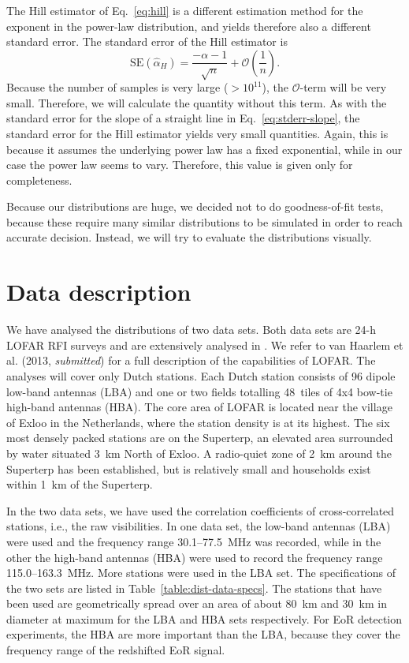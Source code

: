 \documentclass[useAMS,usenatbib]{mn2e}
\begin{document}
The Hill estimator of Eq.~\eqref{eq:hill} is a different estimation method for the exponent in the power-law distribution, and yields therefore also a different standard error. The standard error of the Hill estimator is \citep{power-law-distribution}
\begin{equation} \label{eq:stderr-hill}
 \textrm{SE}(\hat \alpha_H) = \frac{-\alpha - 1}{\sqrt{n}} + \mathcal{O}(\frac{1}{n}).
\end{equation}
Because the number of samples is very large ($>10^{11}$), the $\mathcal{O}$-term will be very small. Therefore, we will calculate the quantity without this term. As with the standard error for the slope of a straight line in Eq.~\eqref{eq:stderr-slope}, the standard error for the Hill estimator yields very small quantities. Again, this is because it assumes the underlying power law has a fixed exponential, while in our case the power law seems to vary. Therefore, this value is given only for completeness.

Because our distributions are huge, we decided not to do goodness-of-fit tests, because these require many similar distributions to be simulated in order to reach accurate decision. Instead, we will try to evaluate the distributions visually.

\section{Data description} \label{sec:dist-data}
We have analysed the distributions of two data sets. Both data sets are 24-h LOFAR RFI surveys and are extensively analysed in
\citet{lofar-radio-environment}. We refer to van Haarlem et al. (2013, \textit{submitted}) for a full description of the capabilities of LOFAR. The analyses will cover only Dutch stations. Each Dutch station consists of 96 dipole low-band antennas (LBA) and one or two fields totalling 48~tiles of 4x4 bow-tie high-band antennas (HBA). The core area of LOFAR is located near the village of Exloo in the Netherlands, where the station density is at its highest. The six most densely packed stations are on the Superterp, an elevated area surrounded by water situated 3~km North of Exloo. A radio-quiet zone of 2~km around the Superterp has been established, but is relatively small and households exist within 1~km of the Superterp.
 
In the two data sets, we have used the correlation coefficients of cross-correlated stations, i.e., the raw visibilities. In one data set, the low-band antennas (LBA) were used and the frequency range 30.1--77.5~MHz was recorded, while in the other the high-band antennas (HBA) were used to record the frequency range 115.0--163.3~MHz. More stations were used in the LBA set. The specifications of the two sets are listed in Table~\ref{table:dist-data-specs}. The stations that have been used are geometrically spread over an area of about 80~km and 30~km in diameter at maximum for the LBA and HBA sets respectively. For EoR detection experiments, the HBA are more important than the LBA, because they cover the frequency range of the redshifted EoR signal.
\end{document}
